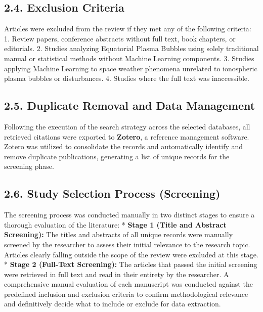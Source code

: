 \hypertarget{exclusion-criteria}{%
\subsection{2.4. Exclusion Criteria}\label{exclusion-criteria}}

Articles were excluded from the review if they met any of the following
criteria: 1. Review papers, conference abstracts without full text, book
chapters, or editorials. 2. Studies analyzing Equatorial Plasma Bubbles
using solely traditional manual or statistical methods without Machine
Learning components. 3. Studies applying Machine Learning to space
weather phenomena unrelated to ionospheric plasma bubbles or
disturbances. 4. Studies where the full text was inaccessible.

\hypertarget{duplicate-removal-and-data-management}{%
\subsection{2.5. Duplicate Removal and Data
Management}\label{duplicate-removal-and-data-management}}

Following the execution of the search strategy across the selected
databases, all retrieved citations were exported to \textbf{Zotero}, a
reference management software. Zotero was utilized to consolidate the
records and automatically identify and remove duplicate publications,
generating a list of unique records for the screening phase.

\hypertarget{study-selection-process-screening}{%
\subsection{2.6. Study Selection Process
(Screening)}\label{study-selection-process-screening}}

The screening process was conducted manually in two distinct stages to
ensure a thorough evaluation of the literature: * \textbf{Stage 1 (Title
and Abstract Screening):} The titles and abstracts of all unique records
were manually screened by the researcher to assess their initial
relevance to the research topic. Articles clearly falling outside the
scope of the review were excluded at this stage. * \textbf{Stage 2
(Full-Text Screening):} The articles that passed the initial screening
were retrieved in full text and read in their entirety by the
researcher. A comprehensive manual evaluation of each manuscript was
conducted against the predefined inclusion and exclusion criteria to
confirm methodological relevance and definitively decide what to include
or exclude for data extraction.

